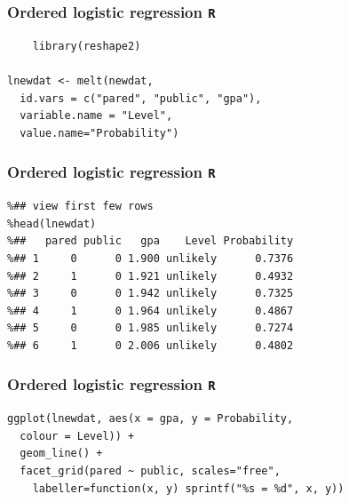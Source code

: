 \documentclass[00-GLMregslides.tex]{subfiles}
\begin{document}
\begin{frame}[fragile]
	\frametitle{Ordered logistic regression \texttt{R} }
\normalsize
\large
\begin{framed}
	\begin{verbatim}
	library(reshape2)
	
lnewdat <- melt(newdat, 
  id.vars = c("pared", "public", "gpa"),
  variable.name = "Level", 
  value.name="Probability")
\end{verbatim}
\end{framed}
\end{frame}
\begin{frame}[fragile]
	\frametitle{Ordered logistic regression \texttt{R} }
	\large
	\begin{framed}
		\begin{verbatim}
%## view first few rows
%head(lnewdat)
%##   pared public   gpa    Level Probability
%## 1     0      0 1.900 unlikely      0.7376
%## 2     1      0 1.921 unlikely      0.4932
%## 3     0      0 1.942 unlikely      0.7325
%## 4     1      0 1.964 unlikely      0.4867
%## 5     0      0 1.985 unlikely      0.7274
%## 6     1      0 2.006 unlikely      0.4802
\end{verbatim}
\end{framed}
\end{frame}
\begin{frame}[fragile]
	\frametitle{Ordered logistic regression \texttt{R} }
\large
\begin{framed}
\begin{verbatim}
ggplot(lnewdat, aes(x = gpa, y = Probability, 
  colour = Level)) +
  geom_line() +
  facet_grid(pared ~ public, scales="free",
    labeller=function(x, y) sprintf("%s = %d", x, y))
    
\end{verbatim}
\end{framed}

\end{frame}
\end{document}
